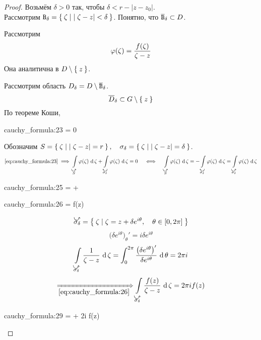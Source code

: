 \begin{proof}
	Возьмём $ \delta > 0 $ так, чтобы $ \delta < r - |z - z_0| $. \\
	Рассмотрим $ \mathtt B_\delta = \Set{\zeta \mid |\zeta - z| < \delta} $. Понятно, что $ \overline{\mathtt B}_\delta \subset D $.

	Рассмотрим
	$$ \varphi(\zeta) = \frac{f(\zeta)}{\zeta - z} $$
	Она аналитична в $ D \setminus \Set{z} $.

	Рассмотрим область $ D_\delta = D \setminus \overline{\mathtt B}_\delta $.
	$$ \overline D_\delta \subset G \setminus \Set z $$
	По теореме Коши,
	\begin{equ}{cauchy_formula:23}
		 = 0
	\end{equ}
	Обозначим $ S = \Set{\zeta \mid |\zeta - z| = r}, \quad \sigma_\delta = \Set{\zeta \mid |\zeta - z| = \delta} $.
	$$ \eref{cauchy_formula:23} \implies \cint[\zeta]{\curvedir S}{\vphi(\zeta)} + \cint[\zeta]{\curvedir[0]{\sigma_\delta}}{\phi(\zeta)} = 0 \quad \iff \quad \cint[\zeta]{\curvedir S}{\vphi(\zeta)} = - \cint[\zeta]{\curvedir[0]{\sigma_\delta}}{\vphi(\zeta)} = \cint[\zeta]{\curvedir{\sigma_\delta}}{\vphi(\zeta)} $$
	\begin{equ}{cauchy_formula:25}
		\cint[\zeta]{\curvedir{\sigma_\delta}}{\vphi(\zeta)} \bdefeq\phi {} =  + 
	\end{equ}
	\begin{equ}{cauchy_formula:26}
		 = f(z) 
	\end{equ}
	$$ \curvedir{\sigma_\delta} = \set{\zeta \mid \zeta = z + \delta e^{i\theta}, \quad \theta \in [0, 2\pi]} $$
	$$ \bigg( \delta e^{i\theta} \bigg)_\theta' = i \delta e^{i\theta} $$
	$$ \cint[\zeta]{\curvedir{\sigma_\delta}}{\frac1{\zeta - z}} = \dint[\theta]0{2\pi}{\frac{\big( \delta e^{i\theta} \big)'}{\delta e^{i\theta}}} = 2\pi i $$
	$$ \underimp{\eref{cauchy_formula:26}} \cint[\zeta]{\curvedir{\sigma_\delta}}{\frac{f(z)}{\zeta - z}} = 2\pi i f(z) $$
	\begin{equ}{cauchy_formula:29}
		  =  + 2\pi i f(z)
	\end{equ}

\end{proof}
